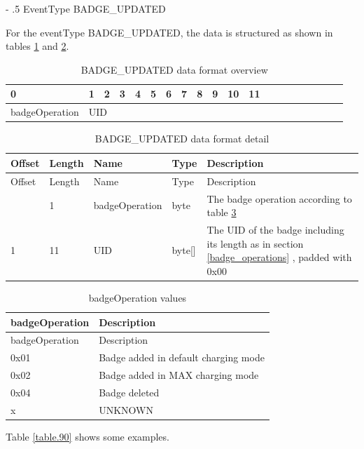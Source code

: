 \documentclass[a4paper]{article}
\makeatletter
\renewcommand\subparagraph{%
   \@startsection{subparagraph}{5}{0mm}%
      {-\baselineskip}%
      {.5\baselineskip}%
      {\normalfont\normalsize\itshape}}
\newcommand{\secref}[1]{\ref{#1} \nameref{#1}}
\makeatother
\begin{document}
\subparagraph{EventType BADGE\_UPDATED}
\label{eventType_BADGE_UPDATED}

For the eventType BADGE\_UPDATED, the data is structured as shown in tables \ref{table.96} and \ref{table.84}.

\begin{longtable}{|l|l|l|l|l|l|l|l|l|l|l|l|l|l|l|l|l|l|l|l|}
	\caption{BADGE\_UPDATED  data format overview}
	\label{table.96}\\  %
	\hline
	0 & 1 & 2 & 3 & 4 & 5 & 6 & 7 & 8 & 9 & 10 & 11 \\
	\hline
	badgeOperation & 
	\multicolumn{11}{|l|}{UID} \\
	\hline
\end{longtable}

\begin{longtable}[]{llllp{7cm}}
	\caption{BADGE\_UPDATED data format detail}
	\label{table.84}
	\tabularnewline
	\toprule\noalign{}
	Offset & Length & Name    & Type     & Description   \\
	\midrule\noalign{}
	\endfirsthead
	\toprule\noalign{}
	Offset & Length & Name      & Type       & Description                                \\
	\midrule\noalign{}
	\endhead
	\bottomrule\noalign{}
	\endlastfoot
	0      & 1      &  badgeOperation & byte   &  The badge operation according to table \ref{table.85}     \\
	1      & 11     & UID     & byte{[}{]} & The UID of the badge including its length as in section \secref{badge_operations}, padded with 0x00	\\
\end{longtable}

\begin{longtable}[]{@{}ll@{}}
	\caption{badgeOperation values}
	\label{table.85}
	\tabularnewline
	\toprule\noalign{}
	badgeOperation & Description    \\
	\midrule\noalign{}
	\endfirsthead
	\toprule\noalign{}
	badgeOperation & Description    \\
	\midrule\noalign{}
	\endhead
	\bottomrule\noalign{}
	\endlastfoot
	0x01  &  Badge added in default charging mode \\
	0x02  &  Badge added in MAX charging mode \\
	0x04  & Badge deleted \\
           x & UNKNOWN\\
\end{longtable}

Table \ref{table.90} shows some examples.
\end{document}
